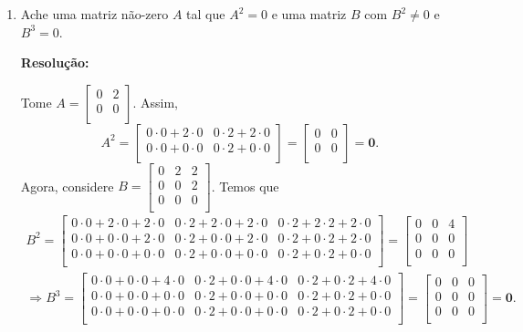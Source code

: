 \documentclass[leqno]{article}
\begin{document}
\begin{enumerate}
    \item Ache uma matriz não-zero $A$ tal que $A^2=0$ e uma matriz $B$ com $B^2\neq0$ e $B^3=0$.
    
    \textbf{Resolução:}
    
    Tome $A=\begin{bmatrix}
    0 & 2\\
    0 & 0\\
    \end{bmatrix}$. Assim, $$A^2=\begin{bmatrix}
    0\cdot0+2\cdot0 & 0\cdot2+2\cdot0\\
    0\cdot0+0\cdot0 & 0\cdot2+0\cdot0\\
    \end{bmatrix}=\begin{bmatrix}
    0 & 0\\
    0 & 0\\
    \end{bmatrix}=\textbf{0}\text{.}$$
    Agora, considere $B=\begin{bmatrix}
    0 & 2 & 2\\
    0 & 0 & 2\\
    0 & 0 & 0\\
    \end{bmatrix}$. Temos que 
    \begin{align*}
        B^2=\begin{bmatrix}
    0\cdot0+2\cdot0+2\cdot0 & 0\cdot2+2\cdot0+2\cdot0 & 0\cdot2+2\cdot2+2\cdot0\\
    0\cdot0+0\cdot0+2\cdot0 & 0\cdot2+0\cdot0+2\cdot0 & 0\cdot2+0\cdot2+2\cdot0\\
    0\cdot0+0\cdot0+0\cdot0 & 0\cdot2+0\cdot0+0\cdot0 & 0\cdot2+0\cdot2+0\cdot0\\
    \end{bmatrix}=\begin{bmatrix}
    0 & 0 & 4\\
    0 & 0 & 0\\
    0 & 0 & 0\\
    \end{bmatrix}\\ \Rightarrow B^3=\begin{bmatrix}
    0\cdot0+0\cdot0+4\cdot0 & 0\cdot2+0\cdot0+4\cdot0 & 0\cdot2+0\cdot2+4\cdot0\\
    0\cdot0+0\cdot0+0\cdot0 & 0\cdot2+0\cdot0+0\cdot0 & 0\cdot2+0\cdot2+0\cdot0\\
    0\cdot0+0\cdot0+0\cdot0 & 0\cdot2+0\cdot0+0\cdot0 & 0\cdot2+0\cdot2+0\cdot0\\
    \end{bmatrix}=\begin{bmatrix}
    0 & 0 & 0\\
    0 & 0 & 0\\
    0 & 0 & 0\\
    \end{bmatrix}=\textbf{0}\text{.}
    \end{align*}
    

\end{enumerate}
\end{document}
